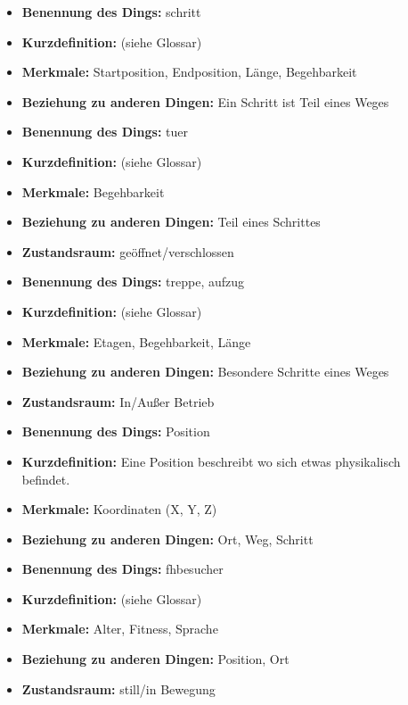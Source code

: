 \hrulefill

\begin{itemize}
\item \textbf{Benennung des Dings:} \Gls{schritt}
\item \textbf{Kurzdefinition:} (siehe Glossar)
\item \textbf{Merkmale:} Startposition, Endposition, Länge, Begehbarkeit
\item \textbf{Beziehung zu anderen Dingen:} Ein Schritt ist Teil eines Weges
\end{itemize}

\hrulefill

\begin{itemize}
\item \textbf{Benennung des Dings:} \Gls{tuer}
\item \textbf{Kurzdefinition:} (siehe Glossar)
\item \textbf{Merkmale:} Begehbarkeit
\item \textbf{Beziehung zu anderen Dingen:} Teil eines Schrittes
\item \textbf{Zustandsraum:} geöffnet/verschlossen
\end{itemize}

\hrulefill

\begin{itemize}
\item \textbf{Benennung des Dings:} \Gls{treppe}, \Gls{aufzug}
\item \textbf{Kurzdefinition:} (siehe Glossar)
\item \textbf{Merkmale:} Etagen, Begehbarkeit, Länge
\item \textbf{Beziehung zu anderen Dingen:} Besondere Schritte eines Weges
\item \textbf{Zustandsraum:} In/Außer Betrieb
\end{itemize}

\hrulefill

\begin{itemize}
\item \textbf{Benennung des Dings:} Position
\item \textbf{Kurzdefinition:} Eine Position beschreibt wo sich etwas physikalisch befindet.
\item \textbf{Merkmale:} Koordinaten (X, Y, Z)
\item \textbf{Beziehung zu anderen Dingen:} Ort, Weg, Schritt
\end{itemize}


\hrulefill

\begin{itemize}
\item \textbf{Benennung des Dings:} \Gls{fhbesucher}
\item \textbf{Kurzdefinition:} (siehe Glossar)
\item \textbf{Merkmale:} Alter, Fitness, Sprache
\item \textbf{Beziehung zu anderen Dingen:} Position, Ort
\item \textbf{Zustandsraum:} still/in Bewegung
\end{itemize}
